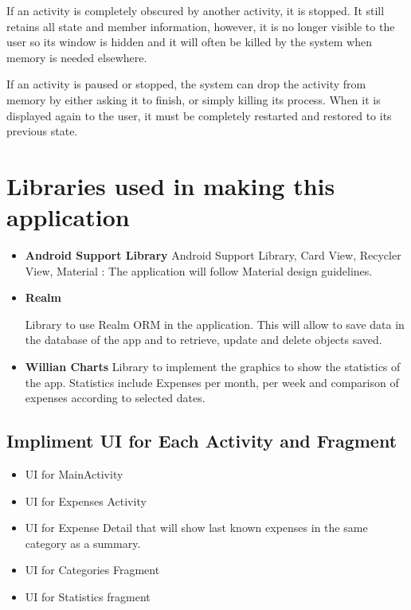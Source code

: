 If an activity is completely obscured by another activity, it is stopped. It still
retains all state and member information, however, it is no longer visible to
the user so its window is hidden and it will often be killed by the system when
memory is needed elsewhere.

If an activity is paused or stopped, the system can drop the activity from memory by either asking it to finish, or simply killing its process. When it is displayed again to the user, it must be completely restarted and restored to its previous state.


\section{Libraries used in making this application}
\begin{itemize}
	\item \textbf{Android Support Library}
Android Support Library, Card View, Recycler View, Material : The application will
follow Material design guidelines.


\item \textbf{Realm}

Library to use Realm ORM in the application. This will allow to save data in
the database of the app and to retrieve, update and delete objects saved.\\

\item \textbf{Willian Charts}
Library to implement the graphics to show the statistics of the
app. Statistics include Expenses per month, per week and comparison of expenses according
to selected dates.



\end{itemize}


\subsection{Impliment UI for Each Activity and Fragment }
\begin{itemize}
	\item UI for MainActivity
\item UI for Expenses Activity
 \item UI for Expense Detail that will show last known expenses in the same category as a summary.
\item UI for Categories Fragment
\item UI for Statistics fragment
\end{itemize}

